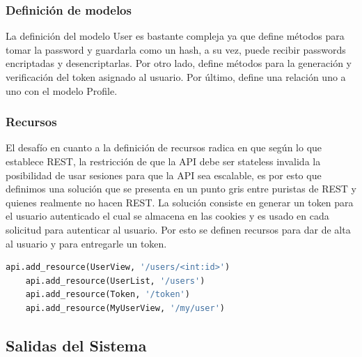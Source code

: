 \subsubsection{Definición de modelos}
La definición del modelo User es bastante compleja ya que define métodos para tomar la password  y guardarla como un hash, a su vez, puede recibir passwords encriptadas y desencriptarlas. Por otro lado, define métodos para la generación y verificación del token asignado al usuario. Por último, define una relación uno a uno con el modelo Profile.

\subsubsection{Recursos}
El desafío en cuanto a la definición de recursos radica en que según lo que establece REST, la restricción de que la API debe ser stateless invalida la posibilidad de usar sesiones para que la API sea escalable, es por esto que definimos una solución que se presenta en un punto gris entre puristas de REST y quienes realmente no hacen REST. La solución consiste en generar un token para el usuario autenticado el cual se almacena en las cookies y es usado en cada solicitud para autenticar al usuario. Por esto se definen recursos para dar de alta al usuario y para entregarle un token.

	\begin{lstlisting}[language=Python]
	api.add_resource(UserView, '/users/<int:id>')
	api.add_resource(UserList, '/users')
	api.add_resource(Token, '/token')
	api.add_resource(MyUserView, '/my/user')
	\end{lstlisting}

\subsection {Salidas del Sistema}

